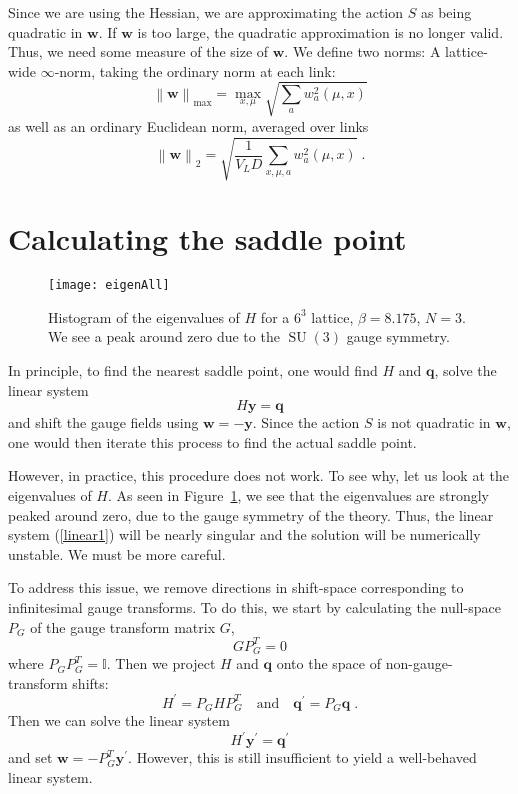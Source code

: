 \documentclass[preprint,aps,prd]{revtex4-2}
\newcommand{\be}{\begin{equation}}
\newcommand{\eq}{\end{equation}}
\DeclareMathOperator{\SU}{SU}
\begin{document}
Since we are using the Hessian, we are approximating
the action $S$ as being quadratic in $\mathbf{w}$.  If $\mathbf{w}$
is too large, the quadratic approximation is no longer valid.
Thus, we need some measure of the size of $\mathbf{w}$.
We define two norms:
A lattice-wide $\infty$-norm, taking the ordinary norm at each link:
\be
\left\lVert \mathbf{w}\right\rVert_{\mathrm{max}} =
     \max_{x,\mu} \sqrt{\sum_a w_a^2(\mu, x)}
\eq
as well as an ordinary Euclidean norm, averaged over links
\be
\left\lVert \mathbf{w}\right\rVert_2 =
     \sqrt{\frac{1}{V_L D} \sum_{x, \mu, a} w_a^2(\mu, x)}
        \; .
\eq



\section{Calculating the saddle point}
\label{saddle}

\begin{figure}
\texttt{[image: eigenAll]}
\caption{Histogram of the eigenvalues of $H$ for a $6^3$ lattice,
  $\beta = 8.175$, $N=3$.  We see a peak around zero due to the
  $\SU(3)$ gauge symmetry.
  \label{eigenAll}}
\end{figure}

In principle, to find the nearest saddle point, one would
find $H$ and $\mathbf{q}$, solve the linear system
\be
    H \mathbf{y} = \mathbf{q} \label{linear1}
\eq
and shift the gauge fields using $\mathbf{w} = -\mathbf{y}$.
Since the action $S$ is not quadratic in $\mathbf{w}$, one
would then iterate this process to find the actual saddle point.

However, in practice, this procedure does not work.  To see why, let us
look at the eigenvalues of $H$.  As seen in Figure~\ref{eigenAll},
we see that the eigenvalues are strongly peaked around zero,
due to the gauge symmetry of the theory.  Thus, the linear
system (\ref{linear1}) will be nearly singular and
the solution will be numerically unstable.  We must be more careful.

To address this issue, we remove directions in shift-space corresponding
to infinitesimal gauge transforms.  To do this, we start
by calculating the null-space $P_G$ of the gauge transform matrix $G$,
\be
G P_G^T = 0
\eq
where $P_G P_G^T = \mathbb{I}$.  Then we project $H$ and $\mathbf{q}$ onto
the space of non-gauge-transform shifts:
\be
         H^\prime = P_G H P_G^T \quad \mbox{and} \quad
         \mathbf{q}^\prime = P_G \mathbf{q} \; .
\eq
Then we can solve the linear system
\be
   H^\prime \mathbf{y}^\prime = \mathbf{q}^\prime \label{linear2}
\eq
and set $\mathbf{w} = - P_G^T \mathbf{y}^\prime$.  However, this is
still insufficient to yield a well-behaved linear system.
\end{document}
